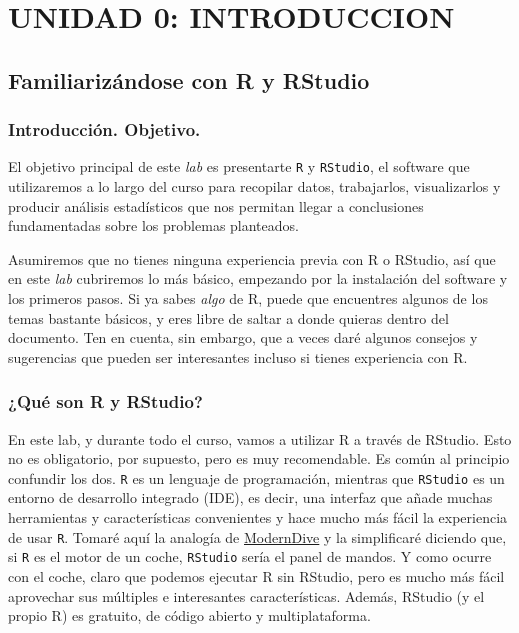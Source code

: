 \documentclass[
  letterpaper,
  DIV=11,
  numbers=noendperiod]{scrreprt}
\begin{document}
\part{UNIDAD 0: INTRODUCCION}

\hypertarget{sec-RStudio}{%
\chapter{Familiarizándose con R y RStudio}\label{sec-RStudio}}

\hypertarget{introducciuxf3n.-objetivo.}{%
\section{Introducción. Objetivo.}\label{introducciuxf3n.-objetivo.}}

El objetivo principal de este \emph{lab} es presentarte \texttt{R} y
\texttt{RStudio}, el software que utilizaremos a lo largo del curso para
recopilar datos, trabajarlos, visualizarlos y producir análisis
estadísticos que nos permitan llegar a conclusiones fundamentadas sobre
los problemas planteados.

Asumiremos que no tienes ninguna experiencia previa con R o RStudio, así
que en este \emph{lab} cubriremos lo más básico, empezando por la
instalación del software y los primeros pasos. Si ya sabes \emph{algo}
de R, puede que encuentres algunos de los temas bastante básicos, y eres
libre de saltar a donde quieras dentro del documento. Ten en cuenta, sin
embargo, que a veces daré algunos consejos y sugerencias que pueden ser
interesantes incluso si tienes experiencia con R.

\hypertarget{quuxe9-son-r-y-rstudio}{%
\section{¿Qué son R y RStudio?}\label{quuxe9-son-r-y-rstudio}}

En este lab, y durante todo el curso, vamos a utilizar R a través de
RStudio. Esto no es obligatorio, por supuesto, pero es muy recomendable.
Es común al principio confundir los dos. \texttt{R} es un lenguaje de
programación, mientras que \texttt{RStudio} es un entorno de desarrollo
integrado (IDE), es decir, una interfaz que añade muchas herramientas y
características convenientes y hace mucho más fácil la experiencia de
usar \texttt{R}. Tomaré aquí la analogía de
\href{https://moderndive.com/index.html}{ModernDive} y la simplificaré
diciendo que, si \texttt{R} es el motor de un coche, \texttt{RStudio}
sería el panel de mandos. Y como ocurre con el coche, claro que podemos
ejecutar R sin RStudio, pero es mucho más fácil aprovechar sus múltiples
e interesantes características. Además, RStudio (y el propio R) es
gratuito, de código abierto y multiplataforma.
\end{document}

